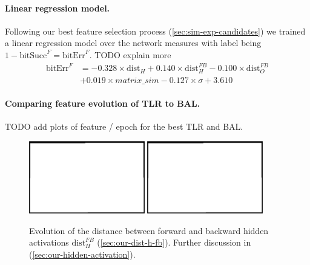 \paragraph{Linear regression model.} 

Following our best feature selection process (\ref{sec:sim-exp-candidates}) we trained a linear regression model over the network measures with label being $1-\mbox{bitSucc}^F = \mbox{bitErr}^F$. TODO explain more 
\begin{align} 
\label{eq:results-candidates-linear-regression} 
\mbox{bitErr}^F &= 
- 0.328 \times \mbox{dist}_{H}
+ 0.140 \times \mbox{dist}_{H}^{FB}
- 0.100 \times \mbox{dist}_{O}^{FB} \nonumber \\
&+ 0.019 \times matrix\_sim
- 0.127 \times \sigma
+ 3.610
\end{align} 

\paragraph{Comparing feature evolution of TLR to BAL.} 

TODO add plots of feature / epoch for the best TLR and BAL. 

\begin{figure}[H]
  \centering
  \includegraphics[width=0.45\textwidth]{img/placeholder.png}  %
  \includegraphics[width=0.45\textwidth]{img/placeholder.png}  %
  \caption{Evolution of the distance between forward and backward hidden activations $\mbox{dist}_{H}^{FB}$ (\ref{sec:our-dist-h-fb}). Further discussion in (\ref{sec:our-hidden-activation}). }
  \label{fig:results-candidates-dist-h-fb}
\end{figure}

